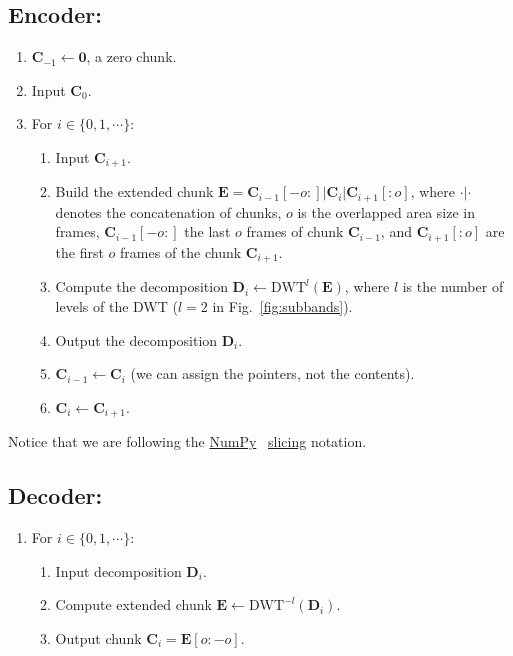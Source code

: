 \subsection*{Encoder:}
\begin{enumerate}
\item ${\mathbf C}_{-1}\leftarrow{\mathbf 0}$, a zero chunk.
\item Input ${\mathbf C}_0$.
\item For $i\in\{0,1,\cdots\}$:   
  \begin{enumerate}               
  \item Input ${\mathbf C}_{i+1}$.
  \item Build the extended chunk ${\mathbf E}={\mathbf
    C}_{i-1}[-o:]|{\mathbf C}_i|{\mathbf C}_{i+1}[:o]$, where
    $\cdot|\cdot$ denotes the concatenation of chunks, $o$ is the
    overlapped area size in frames, ${\mathbf C}_{i-1}[-o:]$ the last
    $o$ frames of chunk ${\mathbf C}_{i-1}$, and ${\mathbf
      C}_{i+1}[:o]$ are the first $o$ frames of the chunk ${\mathbf
      C}_{i+1}$.
  \item Compute the decomposition ${\mathbf D}_i \leftarrow
    \text{DWT}^l({\mathbf E})$, where $l$ is the number of levels of
    the DWT ($l=2$ in Fig.~\ref{fig:subbands}).
  \item Output the decomposition ${\mathbf D}_i$.
  \item ${\mathbf C}_{i-1}\leftarrow {\mathbf C}_i$ (we can assign the pointers, not the contents).
  \item ${\mathbf C}_i\leftarrow {\mathbf C}_{i+1}$.
  \end{enumerate}
\end{enumerate}

Notice that we are following the
\href{https://numpy.org/doc/stable/reference/}{NumPy}~\cite{numpy,harris2020array}
\href{https://www.pythoninformer.com/python-libraries/numpy/index-and-slice/}{slicing}
notation.


\subsection*{Decoder:}
\begin{enumerate}
\item For $i\in\{0,1,\cdots\}$:
  \begin{enumerate}
  \item Input decomposition ${\mathbf D}_i$.
  \item Compute extended chunk ${\mathbf E}\leftarrow\text{DWT}^{-l}({\mathbf D}_i)$.
  \item Output chunk ${\mathbf C}_i={\mathbf E}[o:-o]$.
  \end{enumerate}
\end{enumerate}

